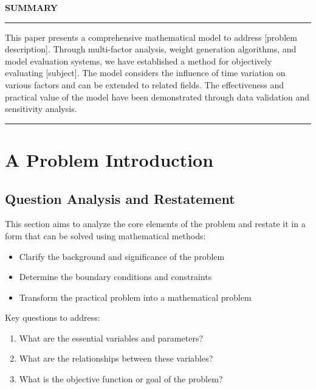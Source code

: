 \documentclass[12pt,a4paper]{article}
\begin{document}
\begin{center}
  \begin{minipage}{0.95\textwidth}
    \begin{center}
      \Large\textbf{SUMMARY}
      \vspace{0.5cm}
    \end{center}
    \hrule
    \vspace{0.5cm}
    This paper presents a comprehensive mathematical model to address [problem description]. Through multi-factor analysis, weight generation algorithms, and model evaluation systems, we have established a method for objectively evaluating [subject]. The model considers the influence of time variation on various factors and can be extended to related fields. The effectiveness and practical value of the model have been demonstrated through data validation and sensitivity analysis.
    \vspace{0.5cm}
    \hrule
  \end{minipage}
\end{center}
\newpage

\renewcommand{\contentsname}{\centerline{CONTENTS}}
\tableofcontents
\newpage

\section{A Problem Introduction}
\subsection{Question Analysis and Restatement}
This section aims to analyze the core elements of the problem and restate it in a form that can be solved using mathematical methods:
\begin{itemize}
  \item Clarify the background and significance of the problem
  \item Determine the boundary conditions and constraints
  \item Transform the practical problem into a mathematical problem
\end{itemize}

Key questions to address:
\begin{enumerate}
  \item What are the essential variables and parameters?
  \item What are the relationships between these variables?
  \item What is the objective function or goal of the problem?
\end{enumerate}
\end{document}
